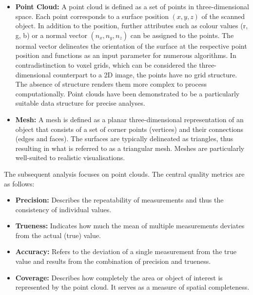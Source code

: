 \begin{English}
    \begin{itemize}
        \item \textbf{Point Cloud:} A point cloud is defined as a set of points in three-dimensional space. Each point corresponds to a surface position \((x, y, z)\) of the scanned object. In addition to the position, further attributes such as colour values (r, g, b) or a normal vector \((n_x, n_y, n_z)\) can be assigned to the points. The normal vector delineates the orientation of the surface at the respective point position and functions as an input parameter for numerous algorithms. In contradistinction to voxel grids, which can be considered the three-dimensional counterpart to a 2D image, the points have no grid structure. The absence of structure renders them more complex to process computationally. Point clouds have been demonstrated to be a particularly suitable data structure for precise analyses. \cite{liu3DPointCloud2021}
        \item \textbf{Mesh:} A mesh is defined as a planar three-dimensional representation of an object that consists of a set of corner points (vertices) and their connections (edges and faces). The surfaces are typically delineated as triangles, thus resulting in what is referred to as a triangular mesh. Meshes are particularly well-suited to realistic visualisations. \cite{borrusoProceduralPointCloud2023}
    \end{itemize}

    The subsequent analysis focuses on point clouds. The central quality metrics are as follows:

    \begin{itemize}
        \item \textbf{Precision:} Describes the repeatability of measurements and thus the consistency of individual values. \cite{wieserKursGeodaetischeMesstechnik}
        
        \item \textbf{Trueness:} Indicates how much the mean of multiple measurements deviates from the actual (true) value. \cite{wieserKursGeodaetischeMesstechnik}
        
        \item \textbf{Accuracy:} Refers to the deviation of a single measurement from the true value and results from the combination of precision and trueness. \cite{wieserKursGeodaetischeMesstechnik}
        
        \item \textbf{Coverage:} Describes how completely the area or object of interest is represented by the point cloud. It serves as a measure of spatial completeness. \cite{wieserKursGeodaetischeMesstechnik}
        

\end{itemize}
\end{English}
